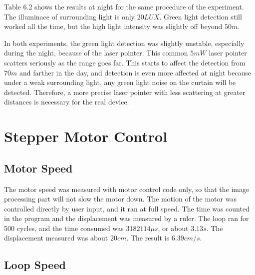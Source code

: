 \documentclass[letterpaper,12pt,oneside]{book}
\begin{document}
		Table 6.2 shows the results at night for the same procedure of the experiment. The illuminace of surrounding light is only $20LUX$. Green light detection still worked all the time, but the high light intensity was slightly off beyond $50m$.
		
		In both experiments, the green light detection was slightly unstable, especially during the night, because of the laser pointer. This common $5mW$ laser pointer scatters seriously as the range goes far. This starts to affect the detection from $70m$ and farther in the day, and detection is even more affected at night because under a weak surrounding light, any green light noise on the curtain will be detected. Therefore, a more precise laser pointer with less scattering at greater distances is necessary for the real device.
		
		\section{Stepper Motor Control}
		
		
		
		\subsection{Motor Speed}
		
		The motor speed was measured with motor control code only, so that the image processing part will not slow the motor down. The motion of the motor was controlled directly by user input, and it ran at full speed. The time was counted in the program and the displacement was measured by a ruler. The loop ran for 500 cycles, and the time consumed was $3182114\mu s$, or about $3.13s$. The displacement measured was about $20cm$. The result is $6.39cm/s$.  
		
		\subsection{Loop Speed}
		
\end{document}
